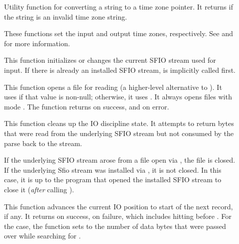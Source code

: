 \begin{description}
\item[\small{}]
Utility function for converting a \C{} string to a time zone pointer.
It returns  if the string is an invalid time zone string.

\item[\small{}]
\item[\small{}]
These functions set the  input and output time zones, respectively.  
See  and
 for more information.

\item[\small{}]
This function initializes or changes the current SFIO stream used for input.
If there is already an installed SFIO stream,  is
implicitly called first.

\item[\small{}]
This function opens a file for reading (a higher-level alternative to ).
It uses  if that value is non-null;
otherwise, it  uses .  It always opens files with mode
.  The function returns  on success, and
 on error.

\item[\small{}]
This function cleans up the IO discipline state.  It attempts to return bytes that were
read from the underlying SFIO stream but not consumed by the parse
back to the stream.

If the underlying SFIO stream arose from a file open via ,
the file is closed.  If the underlying Sfio stream was installed via
, it is not closed. In this case, it is up to the
program that opened the installed SFIO stream to close it
(\textit{after} calling ). 

\item[\small{}]
This function advances the current IO position to start of the next record, if any.
It returns  on success,  on failure, which
includes hitting  before .
For the  case, the function sets  to the number of
data bytes that were passed over while searching for .


\end{description}
